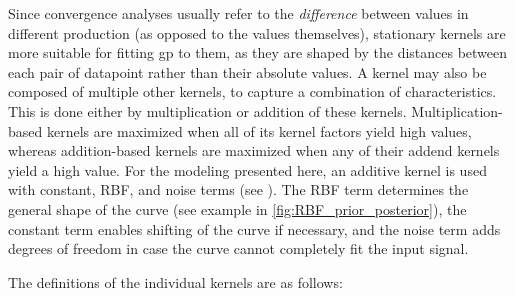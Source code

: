Since convergence analyses usually refer to the \textit{difference} between values in different production (as opposed to the values themselves), stationary kernels are more suitable for fitting \ac{gp} to them, as they are shaped by the distances between each pair of datapoint rather than their absolute values.
A kernel may also be composed of multiple other kernels, to capture a combination of characteristics.
This is done either by multiplication or addition of these kernels.
Multiplication-based kernels are maximized when all of its kernel factors yield high values, whereas
addition-based kernels are maximized when any of their addend kernels yield a high value.
For the modeling presented here, an additive kernel is used with constant, RBF, and noise terms (see ).
The RBF term determines the general shape of the curve (see example in \cref{fig:RBF_prior_posterior}), the constant term enables shifting of the curve if necessary, and the noise term adds degrees of freedom in case the curve cannot completely fit the input signal.

The definitions of the individual kernels are as follows:

